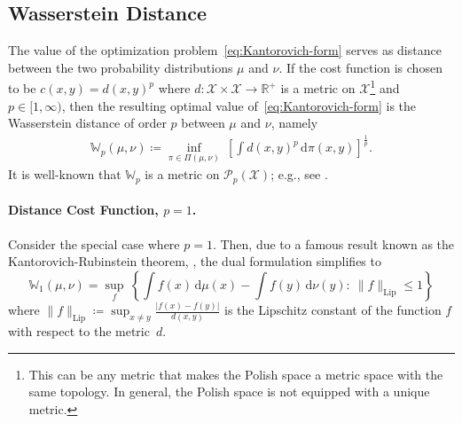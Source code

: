 \documentclass[10pt]{article}
\newcommand{\ud}{\,\mathrm{d}}
\newcommand{\op}[1]{\operatorname{#1}}
\newcommand{\real}{\mathbb{R}}
\newcommand{\W}{\mathds{W}}
\newcommand{\calX}{\mathcal{X}}
\numberwithin{equation}{section}
\begin{document}
\subsection{Wasserstein Distance}
The value of the optimization problem~\eqref{eq:Kantorovich-form} serves as distance between the two probability distributions $\mu$ and $\nu$. If the cost function is chosen to be $c(x,y) = d(x,y)^p$ where $d:\calX \times \calX\to \real^+$ is a metric on $\calX$\footnote{This can be any metric that makes the Polish space a metric space with the same topology. In general, the Polish space is not equipped with a unique metric.} and $p\in[1,\infty)$, then the resulting optimal value of~\eqref{eq:Kantorovich-form} is the Wasserstein distance of order $p$ between $\mu$ and $\nu$, namely
\begin{align*}%
\W_p(\mu,\nu)\coloneqq 
\inf_{\pi \in \Pi(\mu,\nu)} ~\left[\int d(x,y)^p\ud \pi(x,y)\right]^{\frac{1}{p}}. 
\end{align*}
It is well-known that $\W_p$ is a metric on $\mathcal{P}_p(\calX)$; e.g., see  \cite[Theorem 7.3]{villani2003topics}.

\paragraph{Distance Cost Function, $p=1$.}
Consider the special case where $p=1$. Then, due to a famous result known as the Kantorovich-Rubinstein theorem, \cite[Theorem 1.14]{villani2003topics}, the dual formulation simplifies to 
\begin{equation*}
\W_1(\mu,\nu) = \sup_f ~
\left\{ \int f(x) \ud \mu(x) - \int f(y) \ud \nu(y)
:~ \|f\|_{\op{Lip}}\leq 1 \right\}
\end{equation*}
where $\|f\|_{\op{Lip}}\coloneqq\sup_{x\neq y}\frac{|f(x)-f(y)|}{d(x,y)}$ is the Lipschitz constant of the function $f$ with respect to the metric~$d$. 
\end{document}
